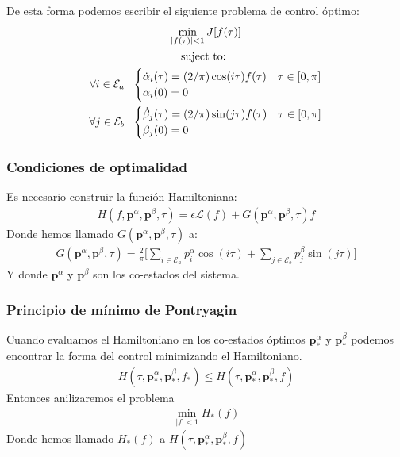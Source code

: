 \begin{frame}
    \frametitle{}
    \begin{problem}
    De esta forma podemos escribir el siguiente problema de control óptimo:
    \begin{gather}
        \min_{|f(\tau) |<1} J[f(\tau)] \\
        \notag \text{suject to: } \\
        \notag \forall i \in \mathcal{E}_a\ \ 
        \begin{cases}
            \dot{\alpha}_i(\tau) = (2/\pi) \cos(i\tau) f(\tau) & \tau \in [0,\pi]\label{dyn}\\
            \alpha_i(0) = 0
        \end{cases} \\
        \notag \forall j \in \mathcal{E}_b\ \ 
        \begin{cases}
            \dot{\beta}_j(\tau) = (2/\pi) \sin(j\tau) f(\tau) & \tau \in [0,\pi]\label{dyn}\\
            \beta_j(0) = 0
        \end{cases} \\
    \end{gather}
    \end{problem}
\end{frame}



\begin{frame}
    \frametitle{Condiciones de optimalidad}

    Es necesario construir la función Hamiltoniana:
    \begin{gather}\label{hamil}
        H(f,\bm{p}^\alpha,\bm{p}^\beta,\tau) = \epsilon \mathcal{L}(f) + 
        G(\bm{p}^\alpha,\bm{p}^\beta,\tau) f
    \end{gather}
    Donde  hemos llamado $G(\bm{p}^\alpha,\bm{p}^\beta,\tau)$ a:
    \begin{gather}
        G(\bm{p}^\alpha,\bm{p}^\beta,\tau) = \frac{2}{\pi} \Bigg[ 
            \sum_{i \in \mathcal{E}_a} p^\alpha_i \cos(i\tau)+ 
            \sum_{j \in \mathcal{E}_b} p^\beta_j \sin(j\tau) 
        \Bigg]
    \end{gather}
    Y donde $\bm{p}^\alpha$ y $\bm{p}^\beta$ son los co-estados del sistema.
\end{frame}


\begin{frame}
    \frametitle{Principio de mínimo de Pontryagin}
    Cuando evaluamos el Hamiltoniano en los co-estados óptimos $\bm{p}_*^\alpha$ y $\bm{p}_*^\beta$ podemos encontrar la forma del control minimizando el Hamiltoniano.
    \begin{gather}\label{minH}
        H(\tau,\bm{p}_*^\alpha,\bm{p}^\beta_*,f_*) \leq
        H(\tau,\bm{p}_*^\alpha,\bm{p}^\beta_*,f)
    \end{gather}
    Entonces anilizaremos el problema 
    \begin{gather}
        \min_{|f|<1} H_*(f)
    \end{gather}
    Donde hemos llamado $H_*(f)$ a $H(\tau,\bm{p}_*^\alpha,\bm{p}^\beta_*,f)$
\end{frame}


